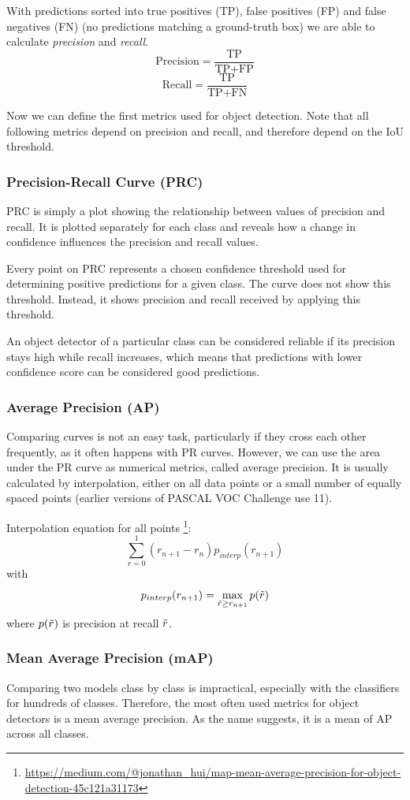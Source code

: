 With predictions sorted into true positives (TP), false positives (FP) and false negatives (FN) (no predictions matching a ground-truth box) we are able to calculate \textit{precision} and \textit{recall}.
$$\text{Precision} = \frac{\text{TP}}{\text{TP}+\text{FP}}$$
$$\text{Recall} = \frac{\text{TP}}{\text{TP}+\text{FN}}$$

Now we can define the first metrics used for object detection. Note that all following metrics depend on precision and recall, and therefore depend on the IoU threshold.

\subsubsection{Precision-Recall Curve (PRC)}
PRC is simply a plot showing the relationship between values of precision and recall. It is plotted separately for each class and reveals how a change in confidence influences the precision and recall values. 

Every point on PRC represents a chosen confidence threshold used for determining positive predictions for a given class. The curve does not show this threshold. Instead, it shows precision and recall received by applying this threshold.

An object detector of a particular class can be considered reliable if its precision stays high while recall increases, which means that predictions with lower confidence score can be considered good predictions.

\subsubsection{Average Precision (AP)}
Comparing curves is not an easy task, particularly if they cross each other frequently, as it often happens with PR curves. However, we can use the area under the PR curve as numerical metrics, called average precision. It is usually calculated by interpolation, either on all data points or a small number of equally spaced points (earlier versions of PASCAL VOC Challenge use 11).

Interpolation equation for all points \footnote{\url{https://medium.com/@jonathan\_hui/map-mean-average-precision-for-object-detection-45c121a31173}}:
$$\sum_{r=0}^1 (r_{n+1} - r_n ) p_{interp}(r_{n+1})$$
with
$$p_{interp}(r_{n+1}) = \max_{\Tilde{r} \geq r_{n+1}} p(\Tilde{r})$$
where $p(\Tilde{r})$ is precision at recall $\Tilde{r}$.

\subsubsection{Mean Average Precision (mAP)}
Comparing two models class by class is impractical, especially with the classifiers for hundreds of classes. Therefore, the most often used metrics for object detectors is a mean average precision. As the name suggests, it is a mean of AP across all classes.

